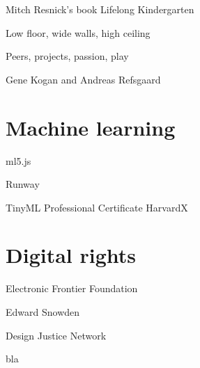 Mitch Resnick's book Lifelong Kindergarten

Low floor, wide walls, high ceiling

Peers, projects, passion, play

Gene Kogan and Andreas Refsgaard

\section{Machine learning}

ml5.js

Runway

TinyML Professional Certificate HarvardX

\section{Digital rights}

Electronic Frontier Foundation

Edward Snowden

Design Justice Network

bla
